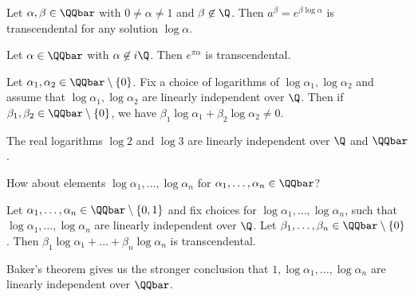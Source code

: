 \begin{thmn} 
	Let \( \alpha, \beta \in \QQbar \) with \( 0 \neq \alpha \neq 1 \) and \( \beta \not\in \Q \).
	Then \( a^\beta = e^{\beta \log \alpha} \) is transcendental for any solution \( \log \alpha \).
\end{thmn}

\begin{cor}
	Let \( \alpha \in \QQbar \) with \( \alpha \not\in i\Q \).
	Then \( e^{\pi\alpha} \) is transcendental.
\end{cor}

\begin{cor}
	Let \( \alpha_1, \alpha_2 \in \QQbar \setminus \{0\} \).
	Fix a choice of logarithms of \( \log \alpha_1, \log\alpha_2 \) and assume that \( \log \alpha_1, \log\alpha_2 \) are linearly independent over \( \Q \).
	Then if \( \beta_1, \beta_2 \in \QQbar \setminus \{0\} \), we have \( \beta_1 \log\alpha_1 + \beta_2 \log\alpha_2 \neq 0 \).
\end{cor}

\begin{exmp*}
	The real logarithms \( \log 2 \) and \( \log 3 \) are linearly independent over \( \Q \) and \( \QQbar \).
\end{exmp*}

\begin{frage*}
	How about elements \( \log \alpha_1, \dotsc, \log\alpha_n \) for \( \alpha_1,\dotsc,\alpha_n \in \QQbar \)?
\end{frage*}

\begin{thmn}[Baker, 1965] 
	Let \( \alpha_1, \dotsc, \alpha_n \in \QQbar \setminus \{0,1\} \) and fix choices for \( \log\alpha_1, \dotsc, \log\alpha_n \), such that \( \log\alpha_1, \dotsc, \log\alpha_n \) are linearly independent over \( \Q \).
	Let \( \beta_1, \dotsc, \beta_n \in \QQbar \setminus \{0\} \).
	Then \( \beta_1 \log\alpha_1 + \dots + \beta_n \log\alpha_n \) is transcendental.
\end{thmn}

\begin{rem*}
	Baker's theorem gives us the stronger conclusion that \( 1, \log\alpha_1, \dotsc, \log\alpha_n \) are linearly independent over \( \QQbar \).
\end{rem*}

